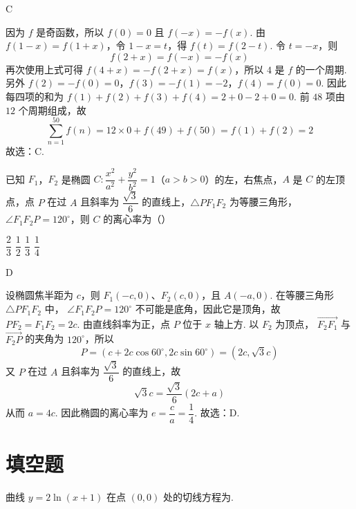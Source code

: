 \begin{answer}
C
\end{answer}

\begin{solution}
因为 \(f\) 是奇函数，所以 \(f(0)=0\) 且 \(f(-x)=-f(x)\). 由
\(f(1-x)=f(1+x)\)，令 \(1-x=t\)，得
\(f(t)=f(2-t)\). 令 \(t=-x\)，则
\[
f(2+x)=f(-x)=-f(x)
\]
再次使用上式可得 \(f(4+x)=-f(2+x)=f(x)\)，所以 \(4\) 是 \(f\) 的一个周期. 另外
\(f(2)=-f(0)=0\)，\(f(3)=-f(1)=-2\)，\(f(4)=f(0)=0\). 因此每四项的和为
\(f(1)+f(2)+f(3)+f(4)=2+0-2+0=0\). 前 \(48\) 项由 \(12\) 个周期组成，故
\[
\sum_{n=1}^{50}f(n)=12\times0+f(49)+f(50)=f(1)+f(2)=2
\]
故选：C.
\end{solution}

\begin{problem}
已知 \(F_1\)，\(F_2\) 是椭圆 \(C:\dfrac{x^2}{a^2}+\dfrac{y^2}{b^2}=1\)（\(a>b>0\)）的左，右焦点，\(A\) 是 \(C\) 的左顶点，点 \(P\) 在过 \(A\) 且斜率为 \(\dfrac{\sqrt3}{6}\) 的直线上，\(\triangle PF_1F_2\) 为等腰三角形，\(\angle F_1F_2P=120^\circ\)，则 \(C\) 的离心率为（\quad）

\choices
    {\(\dfrac23\)}
    {\(\dfrac12\)}
    {\(\dfrac13\)}
    {\(\dfrac14\)}
\end{problem}

\begin{answer}
D
\end{answer}

\begin{solution}
设椭圆焦半距为 \(c\)，则 \(F_1(-c,0)\)、\(F_2(c,0)\)，且
\(A(-a,0)\). 在等腰三角形 \(\triangle PF_1F_2\) 中，
\(\angle F_1F_2P=120^\circ\) 不可能是底角，因此它是顶角，故
\(PF_2=F_1F_2=2c\). 由直线斜率为正，点 \(P\) 位于 \(x\) 轴上方. 以 \(F_2\) 为顶点，
\(\overrightarrow{F_2F_1}\) 与 \(\overrightarrow{F_2P}\) 的夹角为 \(120^\circ\)，所以
\[
P=(c+2c\cos60^\circ,2c\sin60^\circ)=(2c,\sqrt3c)
\]
又 \(P\) 在过 \(A\) 且斜率为 \(\dfrac{\sqrt3}{6}\) 的直线上，故
\[
\sqrt3c=\frac{\sqrt3}{6}(2c+a)
\]
从而 \(a=4c\). 因此椭圆的离心率为
\(e=\dfrac ca=\dfrac14\).
故选：D.
\end{solution}

\section{填空题}

\begin{problem}
曲线 \(y=2\ln(x+1)\) 在点 \((0,0)\) 处的切线方程为\fillinblank{}.
\end{problem}

